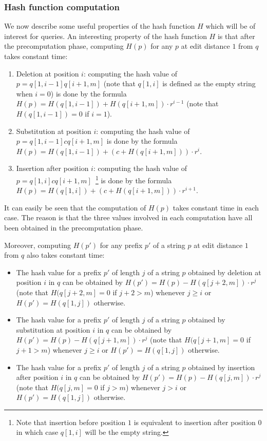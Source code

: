 \documentclass{article}
\newcommand{\?}{\mskip1.5mu}
\begin{document}
\subsubsection{Hash function computation}
We now describe some useful properties of the hash function $H$ which will be of interest for queries. 
An interesting property of the hash function $H$ is that after the precomputation phase, computing $H(p)$ for any $p$ at edit distance $1$ from $q$ takes constant time:
\begin{enumerate}
\item Deletion at position $i$: computing the hash value of $p=q[1,i-1]q[i+1,m]$ (note that $q[1,i]$ is defined as the empty string when $i=0$) is done by the formula $H(p)=H(q[1,i-1])+H(q[i+1,m])\cdot r^{i-1}$ (note that $H(q[1,i-1])=0$ if $i=1$). 
\item Substitution at position $i$: computing the hash value of $p=q[1,i-1]cq[i+1,m]$ is done by the formula $H(p)=H(q[1,i-1])+(c+H(q[i+1,m]))\cdot r^i$. 
\item Insertion after position $i$: computing the hash value of $p=q[1,i]cq[i+1,m]$~\footnote{Note that insertion before position $1$ is equivalent to insertion after position $0$ in which case $q[1,i]$ will be the empty string.} is done by the formula $H(p)=H(q[1,i])+(c+H(q[i+1,m]))\cdot r^{i+1}$.
\end{enumerate}
It can easily be seen that the computation of $H(p)$ takes constant time in each case. The reason is that the three values involved in each computation have all been obtained in the precomputation phase. 

Moreover, computing $H(p')$ for any prefix $p'$ of a string $p$ at edit distance $1$ from $q$ also takes constant time:
\begin{itemize}
\item The hash value for a prefix $p'$ of length $j$ of a string $p$ obtained by deletion at position $i$ in $q$ can be obtained by $H(p')=H(p)-H(q[j+2,m])\cdot r^j$ (note that $H(q[j+2,m]=0$ if $j+2>m$) whenever $j\geq i$ or $H(p')=H(q[1,j])$ otherwise. 
\item The hash value for a prefix $p'$ of length $j$ of a string $p$ obtained by substitution at position $i$ in $q$ can be obtained by $H(p')=H(p)-H(q[j+1,m])\cdot r^j$ (note that $H(q[j+1,m]=0$ if $j+1>m$) whenever $j\geq i$ or $H(p')=H(q[1,j])$ otherwise.
\item The hash value for a prefix $p'$ of length $j$ of a string $p$ obtained by insertion after position $i$ in $q$ can be obtained by $H(p')=H(p)-H(q[j,m])\cdot r^j$ (note that $H(q[j,m]=0$ if $j>m$) whenever $j>i$ or $H(p')=H(q[1,j])$ otherwise. 
\end{itemize}
\end{document}
